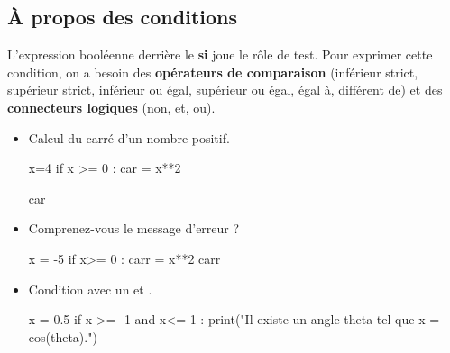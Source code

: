 \subsection{\`A propos des conditions}

L'expression booléenne derrière le \textbf{si} joue le rôle de test. Pour exprimer cette condition, 
on a besoin des \textbf{opérateurs de comparaison} (inférieur strict, supérieur strict, inférieur ou 
égal, supérieur ou égal, égal à, différent de) et des \textbf{connecteurs logiques}
(non, et, ou).

\newpage

\begin{multicols}{2}
\begin{itemize}

\item Calcul du carré d'un nombre positif. 

\begin{pyconsole}
x=4
if x >= 0 : 
    car = x**2

car
\end{pyconsole}

\vfill\null
\columnbreak 

\item Comprenez-vous le message d'erreur ? 



\begin{pyconsole}
x = -5
if x>= 0 :
    carr  = x**2
carr
\end{pyconsole} 

\end{itemize}
\end{multicols}
\begin{itemize}

\item Condition avec un \og et \fg{}. 

\begin{pyconsole}
x = 0.5 
if x >= -1 and x<= 1 :
    print("Il existe un angle theta tel que x = cos(theta).") 

\end{pyconsole}
 \end{itemize}


